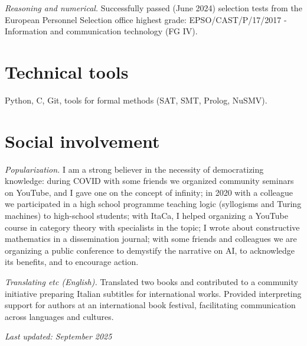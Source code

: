 \documentclass[a4paper,11pt]{article}
\begin{document}
\textit{Reasoning and numerical.} Successfully passed (June 2024) selection tests from the European Personnel Selection office highest grade: EPSO/CAST/P/17/2017 - Information and communication technology (FG IV).


\section*{ Technical tools}
Python, C, Git, tools for formal methods (SAT, SMT, Prolog, NuSMV).
	
\section*{ Social involvement}


\textit{Popularization.} I am a strong believer in the necessity of democratizing knowledge: during COVID with some friends we organized community seminars on YouTube, and I gave one on the concept of infinity; in 2020 with a colleague we participated in a high school programme teaching logic (syllogisms and Turing machines) to high-school students; with ItaCa, I helped organizing a YouTube course in category theory with specialists in the topic; I wrote about constructive mathematics in a dissemination journal; with some friends and colleagues we are organizing a public conference to demystify the narrative on AI, to acknowledge its benefits, and to encourage action.


\textit{Translating etc (English).}  Translated two books and contributed to a community initiative preparing Italian subtitles for international works. Provided interpreting support for authors at an international book festival, facilitating communication across languages and cultures.


\vfill
\hfill\small\textit{Last updated: September 2025}
\end{document}
